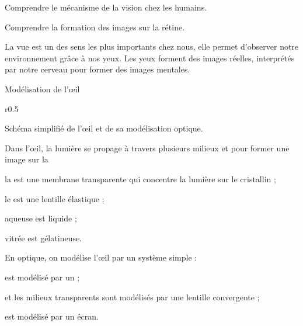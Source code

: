\tetePremStssVisi
{}

\begin{objectifs}
  \item Comprendre le mécanisme de la vision chez les humains.
  \item Comprendre la formation des images sur la rétine.
\end{objectifs}

\begin{contexte}
  La vue est un des sens les plus importants chez nous, elle permet d'observer notre environnement grâce à nos yeux.
  Les yeux forment des images réelles, interprétés par notre cerveau pour former des images mentales.
  
\end{contexte}

\begin{doc}{Modélisation de l’œil}
  \begin{wrapfigure}{r}{0.5\linewidth}
    \vspace*{-30pt}
    \centering

    \vspace*{-12pt}
    \small{Schéma simplifié de l’œil et de sa modélisation optique.}
  \end{wrapfigure}

  Dans l’œil, la lumière se propage à travers plusieurs milieux  et  pour former une image sur la 
  \begin{listePoints}
    \item la  est une membrane transparente qui concentre la lumière sur le cristallin ;
    \item le  est une lentille élastique ;
    \item {} aqueuse est liquide ;
    \item {} vitrée est gélatineuse.
  \end{listePoints}

  En optique, on modélise l’œil par un système simple :
  \begin{listePoints}
    \item {} est modélisé par un  ;
    \item {} et les milieux transparents sont modélisés par une lentille convergente ;
    \item {} est modélisé par un écran.
  \end{listePoints}
\end{doc}

